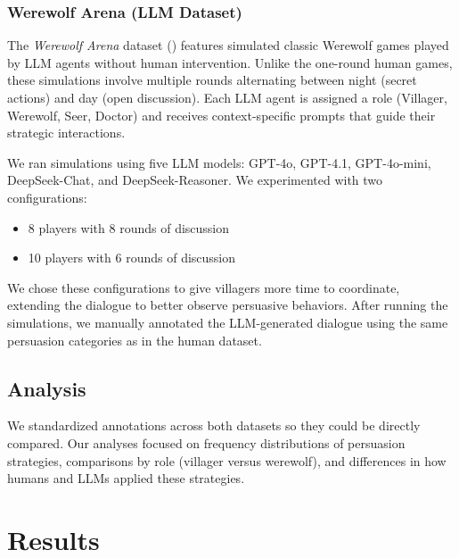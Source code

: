 \documentclass[
  letterpaper,
  DIV=11,
  numbers=noendperiod]{scrreprt}
\begin{document}
\subsection{Werewolf Arena (LLM
Dataset)}\label{werewolf-arena-llm-dataset}

The \emph{Werewolf Arena} dataset
() features simulated classic Werewolf games played by LLM agents
without human intervention. Unlike the one-round human games, these
simulations involve multiple rounds alternating between night (secret
actions) and day (open discussion). Each LLM agent is assigned a role
(Villager, Werewolf, Seer, Doctor) and receives context-specific prompts
that guide their strategic interactions.

We ran simulations using five LLM models: GPT-4o, GPT-4.1, GPT-4o-mini,
DeepSeek-Chat, and DeepSeek-Reasoner. We experimented with two
configurations:

\begin{itemize}
\item
  8 players with 8 rounds of discussion
\item
  10 players with 6 rounds of discussion
\end{itemize}

We chose these configurations to give villagers more time to coordinate,
extending the dialogue to better observe persuasive behaviors. After
running the simulations, we manually annotated the LLM-generated
dialogue using the same persuasion categories as in the human dataset.

\section{Analysis}\label{analysis}

We standardized annotations across both datasets so they could be
directly compared. Our analyses focused on frequency distributions of
persuasion strategies, comparisons by role (villager versus werewolf),
and differences in how humans and LLMs applied these strategies.

\chapter{Results}\label{results}
\end{document}
